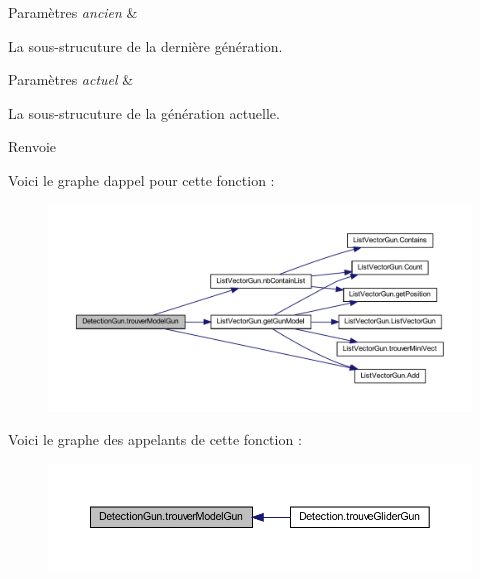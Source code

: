 \begin{DoxyParams}{Paramètres}
{\em ancien} & \\
\hline
\end{DoxyParams}
La sous-\/strucuture de la dernière génération. 
\begin{DoxyParams}{Paramètres}
{\em actuel} & \\
\hline
\end{DoxyParams}
La sous-\/strucuture de la génération actuelle. \begin{DoxyReturn}{Renvoie}

\end{DoxyReturn}
Voici le graphe d\textquotesingle{}appel pour cette fonction \+:\nopagebreak
\begin{figure}[H]
\begin{center}
\leavevmode
\includegraphics[width=350pt]{class_detection_gun_aaafe20e9ecbfe9e95e2f36ac49701d3d_cgraph}
\end{center}
\end{figure}
Voici le graphe des appelants de cette fonction \+:\nopagebreak
\begin{figure}[H]
\begin{center}
\leavevmode
\includegraphics[width=350pt]{class_detection_gun_aaafe20e9ecbfe9e95e2f36ac49701d3d_icgraph}
\end{center}
\end{figure}
